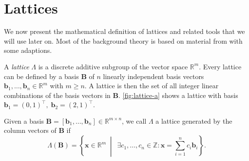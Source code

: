 \section{Lattices}
We now present the mathematical definition of lattices and related tools that we will use later on. Most of the background theory is based on material from \cite{MG02} with some adaptions.

A \textit{lattice} $\Lambda$ is a discrete additive subgroup of the vector space $\mathbb{R}^m$. Every lattice can be defined by a basis $\mathbf{B}$ of $n$ linearly independent basis vectors $\mathbf{b}_1, \ldots, \mathbf{b}_n \in \mathbb{R}^m$ with $m\geq n$. A lattice is then the set of all integer linear combinations of the basis vectors in $\mathbf{B}$. \cref{fig:lattice-a} shows a lattice with basis $\mathbf{b}_1 = (0, 1)^\intercal,\; \mathbf{b}_2 = (2, 1)^\intercal$.

\begin{definition}[Lattice]
    Given a basis $\mathbf{B} = \left[\mathbf{b}_1, \ldots, \mathbf{b}_n\right] \in \mathbb{R}^{m\times n}$, we call $\Lambda$ a lattice generated by the column vectors of $\mathbf{B}$ if
    \begin{equation}
        \Lambda(\mathbf{B}) = \left\{ \mathbf{x} \in \mathbb{R}^m \;\middle\vert\ \; \exists c_1, \ldots, c_n \in \mathbb{Z} : \mathbf{x} = \sum_{i=1}^n c_i \mathbf{b}_i \right\}.
    \end{equation}
\end{definition}

